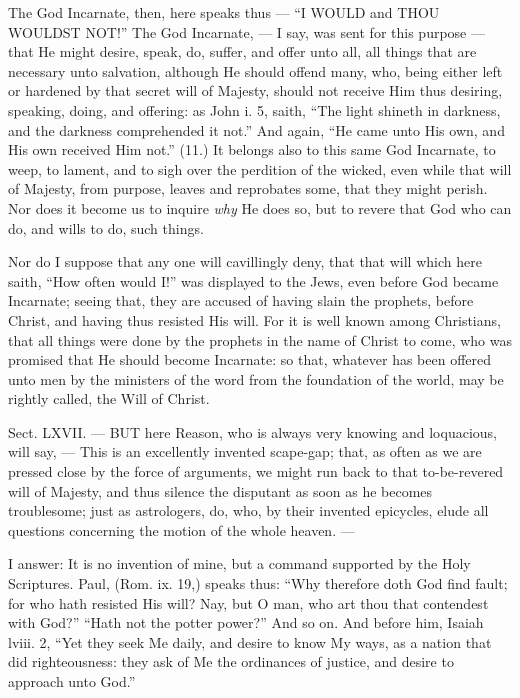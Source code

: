 The God Incarnate, then, here speaks thus — “I \textsc{WOULD }and \textsc{THOU WOULDST NOT}!” The God Incarnate, — I say, was sent for this purpose — that He might desire, speak, do, suffer, and offer unto all, all things that are necessary unto salvation, although He should offend many, who, being either left or hardened by that secret will of Majesty, should not receive Him thus desiring, speaking, doing, and offering: as John i. 5, saith, “The light shineth in darkness, and the darkness comprehended it not.” And again, “He came unto His own, and His own received Him not.” (11.) It belongs also to this same God Incarnate, to weep, to lament, and to sigh over the perdition of the wicked, even while that will of Majesty, from purpose, leaves and reprobates some, that they might perish. Nor does it become us to inquire \emph{why }He does so, but to revere that God who can do, and wills to do, such things.

Nor do I suppose that any one will cavillingly deny, that that will which here saith, “How often would I!” was displayed to the Jews, even before God became Incarnate; seeing that, they are accused of having slain the prophets, before Christ, and having thus resisted His will. For it is well known among Christians, that all things were done by the prophets in the name of Christ to come, who was promised that He should become Incarnate: so that, whatever has been offered unto men by the ministers of the word from the foundation of the world, may be rightly called, the Will of Christ.


Sect. LXVII. — BUT here Reason, who is always very knowing and loquacious, will say, — This is an excellently invented scape-gap; that, as often as we are pressed close by the force of arguments, we might run back to that to-be-revered will of Majesty, and thus silence the disputant as soon as he becomes troublesome; just as astrologers, do, who, by their invented epicycles, elude all questions concerning the motion of the whole heaven. —

I answer: It is no invention of mine, but a command supported by the Holy Scriptures. Paul, (Rom. ix. 19,) speaks thus: “Why therefore doth God find fault; for who hath resisted His will? Nay, but O man, who art thou that contendest with God?” “Hath not the potter power?” And so on. And before him, Isaiah lviii. 2, “Yet they seek Me daily, and desire to know My ways, as a nation that did righteousness: they ask of Me the ordinances of justice, and desire to approach unto God.”

